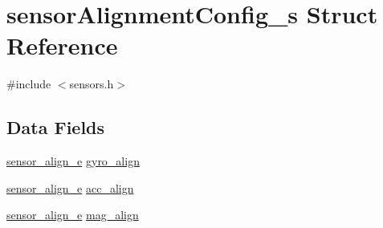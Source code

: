 \hypertarget{structsensorAlignmentConfig__s}{\section{sensor\+Alignment\+Config\+\_\+s Struct Reference}
\label{structsensorAlignmentConfig__s}
}


{\ttfamily \#include $<$sensors.\+h$>$}

\subsection*{Data Fields}
\begin{DoxyCompactItemize}
\item 
\hyperlink{sensors_8h_a64e3c71d4562f54f6e168ac1f597dcf8}{sensor\+\_\+align\+\_\+e} \hyperlink{structsensorAlignmentConfig__s_a4574ce500beb845e45312d1470bdbdfe}{gyro\+\_\+align}
\item 
\hyperlink{sensors_8h_a64e3c71d4562f54f6e168ac1f597dcf8}{sensor\+\_\+align\+\_\+e} \hyperlink{structsensorAlignmentConfig__s_a70199f95983c9a3a6f6c85b00cff8219}{acc\+\_\+align}
\item 
\hyperlink{sensors_8h_a64e3c71d4562f54f6e168ac1f597dcf8}{sensor\+\_\+align\+\_\+e} \hyperlink{structsensorAlignmentConfig__s_a16c1dbaa2e5893897884471ae4055f0e}{mag\+\_\+align}
\end{DoxyCompactItemize}


